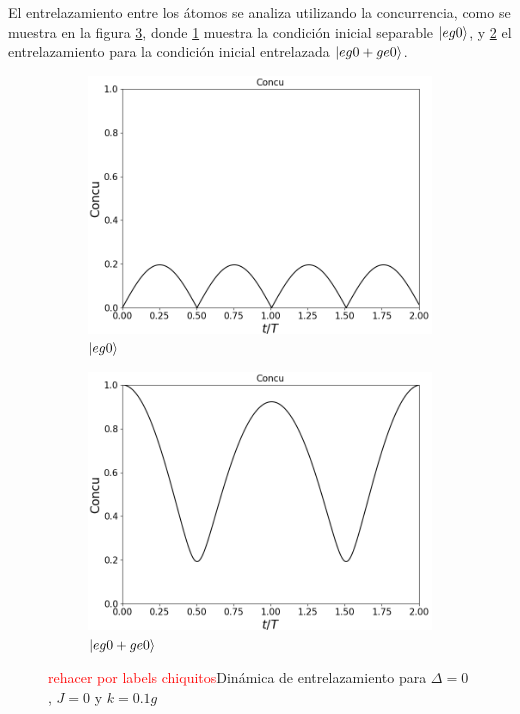 El entrelazamiento entre los átomos se analiza utilizando la concurrencia, como se muestra en la figura \ref{fig4:concu k}, donde \ref{fig4:concu k eg0} muestra la condición inicial separable $\ket{eg0}$, y \ref{fig4:concu k eg0 sim} el entrelazamiento para la condición inicial entrelazada $\ket{eg0+ge0}$. 
\begin{figure}[h]
    \centering
    \begin{subfigure}{0.49\textwidth}
        \includegraphics[width=\textwidth]{figuras/ch4/k eg0 concu.png}
        \caption{$\ket{eg0}$}
        \label{fig4:concu k eg0}
    \end{subfigure}
    \hfill
    \begin{subfigure}{0.49\textwidth}
        \includegraphics[width=\textwidth]{figuras/ch4/k eg0+ concu.png}
        \caption{$\ket{eg0+ge0}$}
        \label{fig4:concu k eg0 sim}
    \end{subfigure}
    \caption{\textcolor{red}{rehacer por labels chiquitos}Dinámica de entrelazamiento para $\Delta=0$, $J=0$ y $k=0.1g$}
    \label{fig4:concu k}
\end{figure}

